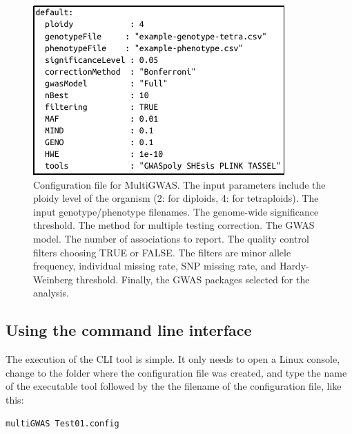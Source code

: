 \documentclass{article}
\begin{document}
\begin{figure}[H]
\begin{centering}
\includegraphics{images/paper-config-file}
\par\end{centering}
\caption{Configuration file for MultiGWAS. The input parameters include the ploidy level of the organism (2: for diploids, 4: for tetraploids). The input genotype/phenotype filenames. The genome-wide significance threshold. The method for multiple testing correction. The GWAS model. The number of associations to report. The quality control filters choosing TRUE or FALSE. The filters are minor allele frequency, individual missing rate, SNP missing rate, and Hardy-Weinberg threshold. Finally, the GWAS packages selected for the analysis.
\label{fig:Configuration-file}}
\end{figure}

\subsection{Using the command line interface}
The execution of the CLI tool is simple. It only needs to open a Linux console, change to the folder where the configuration file was created, and type the name of the executable tool followed by the the filename of the configuration file, like this:

\begin{lstlisting}[language=bash,basicstyle={\small}]
multiGWAS Test01.config
\end{lstlisting}
\end{document}
